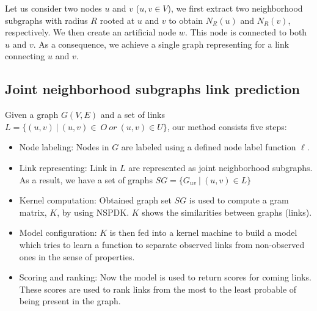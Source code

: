 \documentclass[runningheads,a4paper]{llncs}
\begin{document}
Let us consider two nodes $u$ and $v$ ($u, v \in V$), we first extract two neighborhood subgraphs with radius $R$ rooted at $u$ and $v$ to obtain $N_R(u)$ and $N_R(v)$, respectively. We then create an artificial node $w$. This node is connected to both $u$ and $v$. As a consequence, we achieve a single graph representing for a link connecting $u$ and $v$.
\subsection{Joint neighborhood subgraphs link prediction}
Given a graph $G(V,E)$ and a set of links $L = \lbrace(u,v)\ |\ (u,v)\in\ O\ or\ (u,v)\in U \rbrace$, our method consists five steps:
\begin{itemize}
	\item Node labeling: Nodes in $G$ are labeled using a defined node label function $\ell$.
	\item Link representing: Link in $L$ are represented as joint neighborhood subgraphs. As a result, we have a set of graphs $SG = \lbrace G_{uv}\ |\ (u,v) \in L \rbrace$
	\item Kernel computation: Obtained graph set $SG$ is used to compute a gram matrix, $K$, by using NSPDK. $K$ shows the similarities between graphs (links).
	\item Model configuration: $K$ is then fed into a kernel machine to build a model which tries to learn a function to separate observed links from non-observed ones in the sense of properties.
	\item Scoring and ranking: Now the model is used to return scores for coming links. These scores are used to rank links from the most to the least probable of being present in the graph.
\end{itemize}
\end{document}
